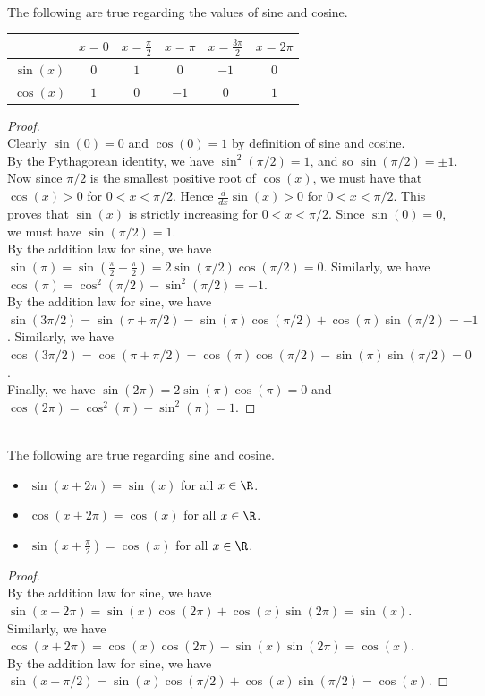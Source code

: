 \documentclass[a4paper]{article}
\begin{document}
\begin{lmm}{}{}\\
The following are true regarding the values of sine and cosine. 
\begin{center}
\begin{tabular}{c|c|c|c|c|c}
 & $x=0$ & $x=\frac{\pi}{2}$ & $x=\pi$ & $x=\frac{3\pi}{2}$ & $x=2\pi$ \\ \hline
$\sin(x)$ & $0$ & $1$ & $0$ & $-1$ & $0$ \\
$\cos(x)$ & $1$ & $0$ & $-1$ & $0$ & $1$
\end{tabular}
\end{center}
\begin{proof}\\
Clearly $\sin(0)=0$ and $\cos(0)=1$ by definition of sine and cosine. \\

By the Pythagorean identity, we have $\sin^2(\pi/2)=1$, and so $\sin(\pi/2)=\pm1$. Now since $\pi/2$ is the smallest positive root of $\cos(x)$, we must have that $\cos(x)>0$ for $0<x<\pi/2$. Hence $\frac{d}{dx}\sin(x)>0$ for $0<x<\pi/2$. This proves that $\sin(x)$ is strictly increasing for $0<x<\pi/2$. Since $\sin(0)=0$, we must have $\sin(\pi/2)=1$. \\

By the addition law for sine, we have $\sin(\pi)=\sin\left(\frac{\pi}{2}+\frac{\pi}{2}\right)=2\sin(\pi/2)\cos(\pi/2)=0$. Similarly, we have $\cos(\pi)=\cos^2(\pi/2)-\sin^2(\pi/2)=-1$. \\

By the addition law for sine, we have $\sin(3\pi/2)=\sin(\pi+\pi/2)=\sin(\pi)\cos(\pi/2)+\cos(\pi)\sin(\pi/2)=-1$. Similarly, we have $\cos(3\pi/2)=\cos(\pi+\pi/2)=\cos(\pi)\cos(\pi/2)-\sin(\pi)\sin(\pi/2)=0$. \\

Finally, we have $\sin(2\pi)=2\sin(\pi)\cos(\pi)=0$ and $\cos(2\pi)=\cos^2(\pi)-\sin^2(\pi)=1$. 
\end{proof}
\end{lmm}

\begin{prp}{}{}\\
The following are true regarding sine and cosine. 
\begin{itemize}
\item $\sin(x+2\pi)=\sin(x)$ for all $x\in\R$. 
\item $\cos(x+2\pi)=\cos(x)$ for all $x\in\R$. 
\item $\sin\left(x+\frac{\pi}{2}\right)=\cos(x)$ for all $x\in\R$. 
\end{itemize}
\begin{proof}\\
By the addition law for sine, we have $\sin(x+2\pi)=\sin(x)\cos(2\pi)+\cos(x)\sin(2\pi)=\sin(x)$. Similarly, we have $\cos(x+2\pi)=\cos(x)\cos(2\pi)-\sin(x)\sin(2\pi)=\cos(x)$. \\

By the addition law for sine, we have $\sin(x+\pi/2)=\sin(x)\cos(\pi/2)+\cos(x)\sin(\pi/2)=\cos(x)$. 
\end{proof}
\end{prp}
\end{document}

